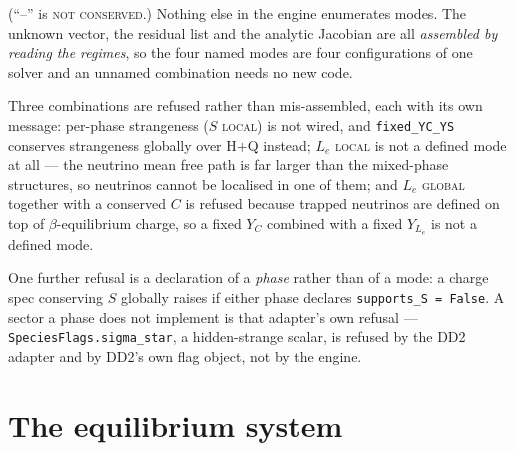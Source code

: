 \documentclass[aps,prc,onecolumn,superscriptaddress,nofootinbib,10pt]{revtex4-2}
\begin{document}
\noindent
(``--'' is \textsc{not conserved}.) Nothing else in the engine enumerates
modes. The unknown vector, the residual list and the analytic Jacobian are all
\emph{assembled by reading the regimes}, so the four named modes are four
configurations of one solver and an unnamed combination needs no new code.

Three combinations are refused rather than mis-assembled, each with its own
message: per-phase strangeness ($S$ \textsc{local}) is not wired, and
\texttt{fixed\_YC\_YS} conserves strangeness globally over H$+$Q instead;
$L_e$ \textsc{local} is not a defined mode at all --- the neutrino mean free
path is far larger than the mixed-phase structures, so neutrinos cannot be
localised in one of them; and $L_e$ \textsc{global} together with a conserved
$C$ is refused because trapped neutrinos are defined on top of
$\beta$-equilibrium charge, so a fixed $Y_C$ combined with a fixed $Y_{L_e}$ is
not a defined mode.

One further refusal is a declaration of a \emph{phase} rather than of a mode:
a charge spec conserving $S$ globally raises if either phase declares
\texttt{supports\_S = False}. A sector a phase does not implement is that
adapter's own refusal --- \texttt{SpeciesFlags.sigma\_star}, a hidden-strange
scalar, is refused by the DD2 adapter and by DD2's own flag object, not by the
engine.

\section{The equilibrium system}
\end{document}
